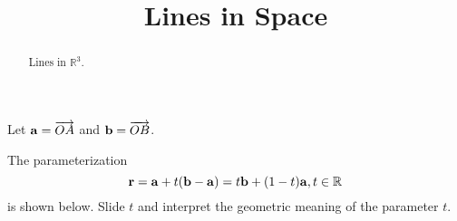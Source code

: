 \documentclass{ximera}
\title{Lines in Space}
\begin{document}
\begin{abstract}
Lines in $\mathbb{R}^3$.
\end{abstract}
\maketitle


\begin{exploration}   \label{Exsd67g:Line}
Let ${\bf a} = \overrightarrow{OA}$ and  ${\bf b} = \overrightarrow{OB}$.

The parameterization 
\[
    {\bf r} = {\bf a} + t({\bf b} - {\bf a}) = t{\bf b} + (1-t){\bf a} , t\in \mathbb{R}
\]
is shown below. Slide $t$ and interpret the geometric meaning of the parameter $t$.

 
\begin{onlineOnly}
    \begin{center}
\end{center}
\end{onlineOnly}

\end{exploration}
\end{document}
